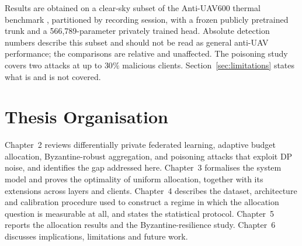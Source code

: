 Results are obtained on a clear-sky subset of the Anti-UAV600 thermal benchmark
\cite{zhao20233rd}, partitioned by recording session, with a frozen publicly
pretrained trunk and a 566,789-parameter privately trained head. Absolute
detection numbers describe this subset and should not be read as general
anti-UAV performance; the comparisons are relative and unaffected. The poisoning
study covers two attacks at up to $30\%$ malicious clients.
Section~\ref{sec:limitations} states what is and is not covered.

\section{Thesis Organisation}

Chapter~2 reviews differentially private federated learning, adaptive budget
allocation, Byzantine-robust aggregation, and poisoning attacks that exploit DP
noise, and identifies the gap addressed here. Chapter~3 formalises the system
model and proves the optimality of uniform allocation, together with its
extensions across layers and clients. Chapter~4 describes the dataset,
architecture and calibration procedure used to construct a regime in which the
allocation question is measurable at all, and states the statistical protocol.
Chapter~5 reports the allocation results and the Byzantine-resilience study.
Chapter~6 discusses implications, limitations and future work.
